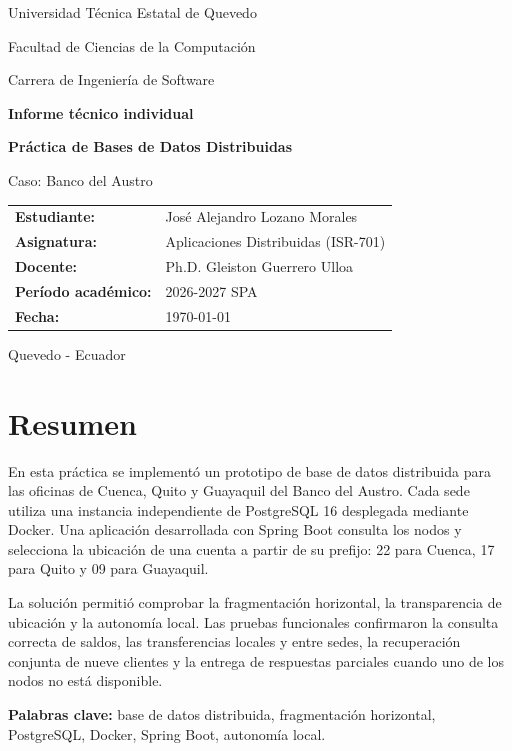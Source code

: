 \documentclass[12pt,a4paper]{article}
\newcommand{\estudiante}{José Alejandro Lozano Morales}
\newcommand{\docente}{Ph.D. Gleiston Guerrero Ulloa}
\newcommand{\asignatura}{Aplicaciones Distribuidas (ISR-701)}
\newcommand{\periodo}{2026-2027 SPA}
\begin{document}
\begin{titlepage}
  \centering
  {\large Universidad Técnica Estatal de Quevedo\par}
  \vspace{0.3cm}
  {\large Facultad de Ciencias de la Computación\par}
  {\large Carrera de Ingeniería de Software\par}
  \vfill
  {\Huge\bfseries Informe técnico individual\par}
  \vspace{0.4cm}
  {\LARGE\bfseries Práctica de Bases de Datos Distribuidas\par}
  \vspace{0.25cm}
  {\Large Caso: Banco del Austro\par}
  \vfill
  \begin{tabular}{>{\bfseries}l l}
    Estudiante: & \estudiante \\
    Asignatura: & \asignatura \\
    Docente: & \docente \\
    Período académico: & \periodo \\
    Fecha: & \today
  \end{tabular}
  \vfill
  {Quevedo - Ecuador\par}
\end{titlepage}

\tableofcontents
\newpage

\section{Resumen}

En esta práctica se implementó un prototipo de base de datos distribuida para las oficinas de Cuenca, Quito y Guayaquil del Banco del Austro. Cada sede utiliza una instancia independiente de PostgreSQL 16 desplegada mediante Docker. Una aplicación desarrollada con Spring Boot consulta los nodos y selecciona la ubicación de una cuenta a partir de su prefijo: 22 para Cuenca, 17 para Quito y 09 para Guayaquil.

La solución permitió comprobar la fragmentación horizontal, la transparencia de ubicación y la autonomía local. Las pruebas funcionales confirmaron la consulta correcta de saldos, las transferencias locales y entre sedes, la recuperación conjunta de nueve clientes y la entrega de respuestas parciales cuando uno de los nodos no está disponible.

\textbf{Palabras clave:} base de datos distribuida, fragmentación horizontal, PostgreSQL, Docker, Spring Boot, autonomía local.
\end{document}
